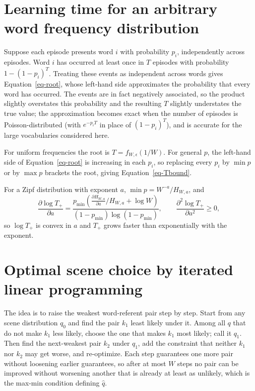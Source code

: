 \documentclass[a4paper,natbib,man]{apa6}
\begin{document}
\section{Learning time for an arbitrary word frequency distribution}
\label{app-bound}
Suppose each episode presents word $i$ with probability $p_i$, independently across episodes. Word $i$ has occurred at least once in $T$ episodes with probability $1-(1-p_i)^T$. Treating these events as independent across words gives Equation~\ref{eq-root}, whose left-hand side approximates the probability that every word has occurred. The events are in fact negatively associated, so the product slightly overstates this probability and the resulting $T$ slightly understates the true value; the approximation becomes exact when the number of episodes is Poisson-distributed (with $e^{-p_i T}$ in place of $(1-p_i)^T$), and is accurate for the large vocabularies considered here.

For uniform frequencies the root is $T = f_{W,\epsilon}(1/W)$. For general $p$, the left-hand side of Equation~\ref{eq-root} is increasing in each $p_i$, so replacing every $p_i$ by $\min p$ or by $\max p$ brackets the root, giving Equation~\ref{eq-Tbound}.

For a Zipf distribution with exponent $a$, $\min p = W^{-a}/H_{W,a}$, and
\[
 \frac{\partial \log T_{+}}{ \partial a } = \frac{ p_{\min} \left( \frac{ \partial H_{W, a} }{ \partial a}/ H_{W, a} + \log W \right) }{ ( 1 - p_{\min} ) \log\left( 1 - p_{\min} \right) },
 \qquad
 \frac{\partial^2 \log T_{+}}{ \partial a^2 } \ge 0,
\]
so $\log T_+$ is convex in $a$ and $T_+$ grows faster than exponentially with the exponent.

\section{Optimal scene choice by iterated linear programming}
\label{app-ilp}
The idea is to raise the weakest word-referent pair step by step. Start from any scene distribution $q_0$ and find the pair $k_1$ least likely under it. Among all $q$ that do not make $k_1$ less likely, choose the one that makes $k_1$ most likely; call it $q_1$. Then find the next-weakest pair $k_2$ under $q_1$, add the constraint that neither $k_1$ nor $k_2$ may get worse, and re-optimize. Each step guarantees one more pair without loosening earlier guarantees, so after at most $W$ steps no pair can be improved without worsening another that is already at least as unlikely, which is the max-min condition defining $\hat q$.
\end{document}

